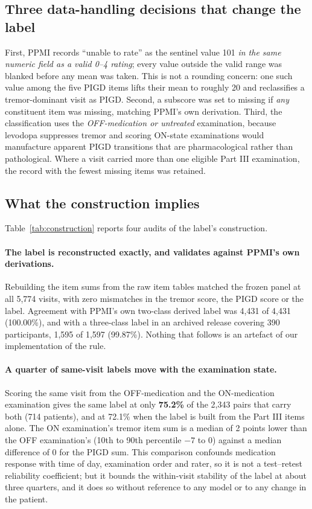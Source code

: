 \documentclass[11pt]{article}
\begin{document}
\subsection{Three data-handling decisions that change the label}
First, PPMI records ``unable to rate'' as the sentinel value 101 \emph{in the
same numeric field as a valid 0--4 rating}; every value outside the valid range
was blanked before any mean was taken. This is not a rounding concern: one such
value among the five PIGD items lifts their mean to roughly 20 and reclassifies a
tremor-dominant visit as PIGD. Second, a subscore was set to missing if
\emph{any} constituent item was missing, matching PPMI's own derivation. Third,
the classification uses the \emph{OFF-medication or untreated} examination,
because levodopa suppresses tremor and scoring ON-state examinations would
manufacture apparent PIGD transitions that are pharmacological rather than
pathological. Where a visit carried more than one eligible Part III examination,
the record with the fewest missing items was retained.

\subsection{What the construction implies}

Table~\ref{tab:construction} reports four audits of the label's construction.

\paragraph{The label is reconstructed exactly, and validates against PPMI's own
derivations.} Rebuilding the item sums from the raw item tables matched the
frozen panel at all 5,774 visits, with zero mismatches in the tremor score, the
PIGD score or the label. Agreement with PPMI's own two-class derived label was
4,431 of 4,431 (100.00\%), and with a three-class label in an archived release
covering 390 participants, 1,595 of 1,597 (99.87\%). Nothing that follows is an
artefact of our implementation of the rule.

\paragraph{A quarter of same-visit labels move with the examination state.}
Scoring the same visit from the OFF-medication and the ON-medication examination
gives the same label at only \textbf{75.2\%} of the 2,343 pairs that carry both
(714 patients), and at 72.1\% when the label is built from the Part III items
alone. The ON examination's tremor item sum is a median of 2 points lower than
the OFF examination's (10th to 90th percentile $-7$ to $0$) against a median
difference of 0 for the PIGD sum. This comparison confounds medication response
with time of day, examination order and rater, so it is not a test--retest
reliability coefficient; but it bounds the within-visit stability of the label at
about three quarters, and it does so without reference to any model or to any
change in the patient.
\end{document}
